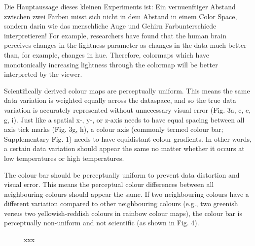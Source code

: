 Die Hauptaussage dieses kleinen Experiments ist: Ein vernuenftiger Abstand zwischen zwei Farben misst sich nicht in dem Abstand in einem Color Space, sondern darin wie das menschliche Auge und Gehirn Farbunterschiede interpretieren!
For example, researchers have found that the human brain perceives changes in the lightness parameter as changes in the data much better than, for example, changes in hue. Therefore, colormaps which have monotonically increasing lightness through the colormap will be better interpreted by the viewer.


Scientifically derived colour maps are perceptually uniform. This means the same data variation is weighted equally across the dataspace, and so the true data variation is accurately represented without unnecessary visual error (Fig. 3a, c, e, g, i). Just like a spatial x-, y-, or z-axis needs to have equal spacing between all axis tick marks (Fig. 3g, h), a colour axis (commonly termed colour bar; Supplementary Fig. 1) needs to have equidistant colour gradients. In other words, a certain data variation should appear the same no matter whether it occurs at low temperatures or high temperatures.

The colour bar should be perceptually uniform to prevent data distortion and visual error. This means the perceptual colour differences between all neighbouring colours should appear the same. If two neighbouring colours have a different variation compared to other neighbouring colours (e.g., two greenish versus two yellowish-reddish colours in rainbow colour maps), the colour bar is perceptually non-uniform and not scientific (as shown in Fig. 4).

\begin{figure}
	\centering
	
	\caption{xxx}
	\label{fig:colorspaces}
\end{figure}





	
		 
